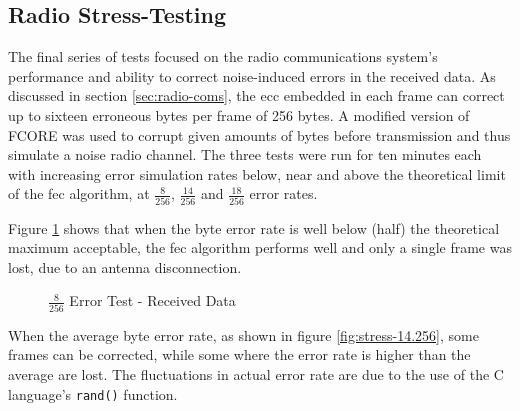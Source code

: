 \subsection{Radio Stress-Testing}

The final series of tests focused on the radio communications system's
performance and ability to correct noise-induced errors in the received data.
As discussed in section \ref{sec:radio-coms}, the \acrfull{ecc} embedded in
each frame can correct up to sixteen erroneous bytes per frame of 256 bytes.
A modified version of FCORE was used to corrupt given amounts of bytes before
transmission and thus simulate a noise radio channel. The three tests were run
for ten minutes each with increasing error simulation rates below, near and
above the theoretical limit of the \acrshort{fec} algorithm, at $\frac{8}{256}$,
$\frac{14}{256}$ and $\frac{18}{256}$ error rates.

Figure \ref{fig:stress-8.256} shows that when the byte error rate is well below
(half) the theoretical maximum acceptable, the \acrshort{fec} algorithm performs
well and only a single frame was lost, due to an antenna disconnection.

\begin{figure}[H]
\centering
\caption{$\frac{8}{256}$ Error Test - Received Data}
\label{fig:stress-8.256}
\end{figure}

When the average byte error rate, as shown in figure \ref{fig:stress-14.256},
some frames can be corrected, while some where the error rate is higher than
the average are lost. The fluctuations in actual error rate are due to the use
of the C language's \texttt{rand()} function. %

